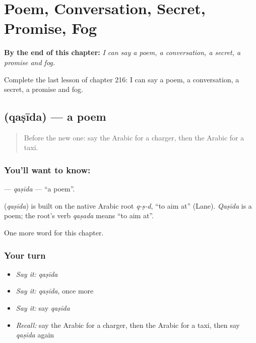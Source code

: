 
\chapter{Poem, Conversation, Secret, Promise, Fog}
\label{ch:ar-poem-conversation-secret-promise-fog}

\begin{chapteropening}
\textbf{By the end of this chapter:} \emph{I can say a poem, a conversation, a secret, a promise and fog.}

Complete the last lesson of chapter 216: I can say a poem, a conversation, a secret, a promise and fog.
\end{chapteropening}

\section[\texorpdfstring{\ar{قصيدة} (qaṣīda)}{قصيدة (qaṣīda)}]{ (qaṣīda) — a poem}

\label{lesson:AR-C216-qasida}



\begin{quote}
Before the new one: say the Arabic for a charger, then the Arabic for a taxi.
\end{quote}

\subsection*{You'll want to know: }
\textbf{} — \emph{qaṣīda} — \textquotedblleft{}a poem\textquotedblright{}.

\begin{cousinweb}
\textbf{} (\emph{qaṣīda}) is built on the native Arabic root \emph{q-ṣ-d}, \textquotedblleft{}to aim at\textquotedblright{} (Lane). \emph{Qaṣīda} is a poem; the root's verb \emph{qaṣada} means \textquotedblleft{}to aim at\textquotedblright{}.
\end{cousinweb}

\begin{grammarlens}[title={What you've built}]
One more word for this chapter.
\end{grammarlens}

\subsection*{Your turn}
\begin{itemize}
\raggedright
  \item \emph{Say it:} \emph{qaṣīda}
  \item \emph{Say it:} \emph{qaṣīda}, once more
  \item \emph{Say it:} say \emph{qaṣīda}
  \item \emph{Recall:} say the Arabic for a charger, then the Arabic for a taxi, then say \emph{qaṣīda} again
\end{itemize}

